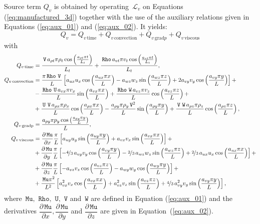 \documentclass[10pt]{article}
\newcommand{\diff}[2] {\dfrac{\partial #1}{\partial #2}}
\newcommand{\Rho}{\,\mathtt{Rho}}
\newcommand{\U}{\,\mathtt{U}}
\newcommand{\V}{\,\mathtt{V}}
\newcommand{\W}{\,\mathtt{W}}
\newcommand{\Lo}{\,\mathcal{L}}
\newcommand{\Mu}{\,\mathtt{Mu}}
\newcommand{\DMuDx}{\diff{\Mu}{x}}
\newcommand{\DMuDy}{\diff{\Mu}{y}}
\newcommand{\DMuDz}{\diff{\Mu}{z}}
\newcommand{\convection}{\text{convection}}
\newcommand{\gradp}{\text{grad}p}
\newcommand{\viscous}{\text{viscous}}
\begin{document}
Source term $Q_v$ is obtained by operating $\Lo_{v}$ on Equations  (\ref{eq:manufactured_3d}) together with the use of the  auxiliary relations given in Equations (\ref{eq:aux_01}) and (\ref{eq:aux_02}). It yields:
\begin{equation*}
 \label{eq:ns1d_12}
Q_v = Q_{v \, \text{time}}+Q_{v \, \convection}+Q_{v \, \gradp }+Q_{v \, \viscous }
\end{equation*}
with
%
\begin{equation*}
 \begin{split}
 Q_{v \, \text{time}}&= \frac{\V \, a_{\rho t} \pi \rho_{t} \cos\left(\frac{a_{\rho t} \pi t}{L_t}\right)}{L_t} + \frac{ \Rho \, a_{vt}\pi v_{t} \cos\left(\frac{a_{vt} \pi t}{L_t}\right)}{L_t} ,\\
%
 Q_{v \, \text{convection}}&= 
\frac{\pi \Rho \, \V \, }{L} \left[a_{ux} u_{x} \cos\left(\frac{a_{ux} \pi x}{L}\right) - a_{wz} w_{z} \sin\left(\frac{a_{wz} \pi z}{L}\right) + 2 a_{vy} v_{y} \cos\left(\frac{a_{vy} \pi y}{L}\right)\right]+ \\ 
&- \frac{\Rho \, \U \, a_{vx} \pi v_{x} }{L}\sin\left(\frac{a_{vx} \pi x}{L}\right) + \frac{\Rho \, \W \, a_{vz} \pi v_{z} }{L} \cos\left(\frac{a_{vz} \pi z}{L}\right)+ \\ 
&+ \frac{\U \, \V \, a_{\rho x} \pi \rho_{x} }{L}\cos\left(\frac{a_{\rho x} \pi x}{L}\right) - \frac{a_{\rho y} \pi \rho_{y} \V^{2} }{L} \sin\left(\frac{a_{\rho y} \pi y}{L}\right)+ \frac{\V \, \W \, a_{\rho z} \pi \rho_{z} }{L}\cos\left(\frac{a_{\rho z} \pi z}{L}\right) ,\\
%
 Q_{v \, \text{gradp}}&= \frac{a_{py} \pi p_{y} \cos\left(\frac{a_{py} \pi y}{L}\right)}{L},\\
%
 Q_{v \, \text{viscous}}&= 
\DMuDx\frac{\pi }{L} \left[a_{uy} u_{y} \sin\left(\frac{a_{uy} \pi y}{L}\right) + a_{vx} v_{x} \sin\left(\frac{a_{vx} \pi x}{L}\right)\right] + \\ 
&+ \DMuDy\frac{\pi }{L} \left[- \nicefrac{4}{3} \, a_{vy} v_{y} \cos\left(\frac{a_{vy} \pi y}{L}\right) - \nicefrac{2}{3} \, a_{wz} w_{z} \sin\left(\frac{a_{wz} \pi z}{L}\right) + \nicefrac{2}{3} \, a_{ux} u_{x} \cos\left(\frac{a_{ux} \pi x}{L}\right)\right] + \\ 
&+ \DMuDz\frac{\pi }{L} \left[- a_{vz} v_{z} \cos\left(\frac{a_{vz} \pi z}{L}\right) - a_{wy} w_{y} \cos\left(\frac{a_{wy} \pi y}{L}\right)\right] + \\ 
&+ \frac{\Mu \pi^{2} }{L^2} \left[a_{vx}^{2} v_{x} \cos\left(\frac{a_{vx} \pi x}{L}\right) + a_{vz}^{2} v_{z} \sin\left(\frac{a_{vz} \pi z}{L}\right) + \nicefrac{4}{3} \, a_{vy}^{2} v_{y} \sin\left(\frac{a_{vy} \pi y}{L}\right)\right],
 \end{split}
\end{equation*}
where $\Mu,\, \Rho,\,\U,\,\V$ and $\W$  are defined in Equation (\ref{eq:aux_01}) and the derivatives $\DMuDx,\DMuDy$ and $\DMuDz$ are given in Equation~(\ref{eq:aux_02}).
\end{document}
